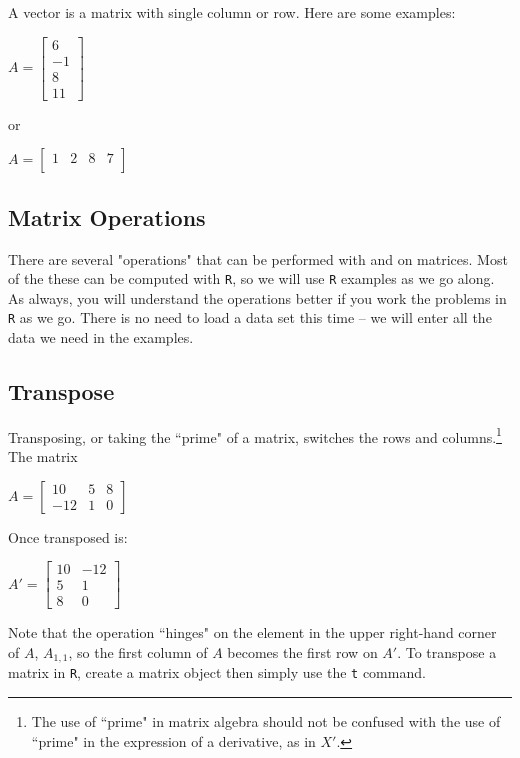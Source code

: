 \documentclass[11pt,openany]{book}\usepackage[]{graphicx}\usepackage[]{color}
\begin{document}
{A vector is a matrix with single column or row. Here are some examples:  

$A = 
\begin{bmatrix}
6 \\
-1 \\
8 \\
11
\end{bmatrix}$

\noindent or 

$A =
\begin{bmatrix}
  1 & 2 & 8 & 7 \\
\end{bmatrix}$  
  
\subsection{Matrix Operations}

There are several "operations" that can be performed with and on matrices. Most of the these can be computed with \texttt{R}, so we will use \texttt{R} examples as we go along. As always, you will understand the operations better if you work the problems in \texttt{R} as we go. There is no need to load a data set this time -- we will enter all the data we need in the examples.
  
\subsection{Transpose}

Transposing, or taking the ``prime" of a matrix, switches the rows and columns.\footnote{The use of ``prime" in matrix algebra should not be confused
with the use of ``prime" in the expression of a derivative, as in $X'$.} The matrix
\noindent


$A = 
\begin{bmatrix}
  10 & 5 & 8 \\
  -12 & 1 & 0
\end{bmatrix}$

\noindent

Once transposed is: 

$A' =
\begin{bmatrix}
  10 & -12 \\
  5 & 1 \\
  8 & 0
\end{bmatrix}$

\noindent 
Note that the operation ``hinges" on the element in the upper right-hand corner of $A$, $A_{1,1}$, so the first column of $A$ becomes the first row on $A'$. To transpose a matrix in \texttt{R}, create a matrix object then simply use the \texttt{t} command. 

}
\end{document}
